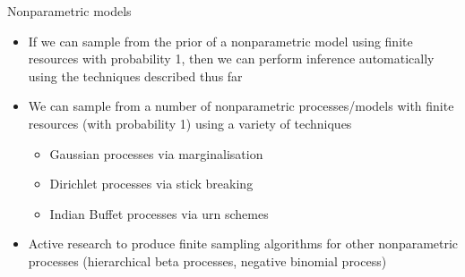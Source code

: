 \begin{frame}{Nonparametric models}
  \begin{itemize}
    \item If we can sample from the prior of a nonparametric model using finite resources with probability 1, then we can perform inference automatically using the techniques described thus far
    \vspace{\baselineskip}
    \item We can sample from a number of nonparametric processes/models with finite resources (with probability 1) using a variety of techniques
    \begin{itemize}
      \item Gaussian processes via marginalisation
      \item Dirichlet processes via stick breaking
      \item Indian Buffet processes via urn schemes
    \end{itemize}
    \vspace{\baselineskip}
    \item Active research to produce finite sampling algorithms for other nonparametric processes (\eg hierarchical beta processes, negative binomial process)
  \end{itemize}
\end{frame}



